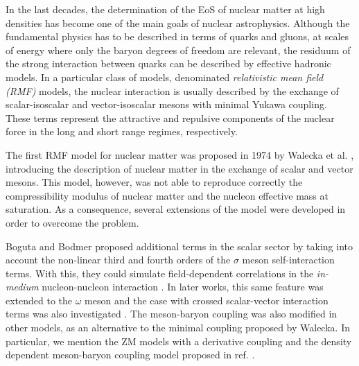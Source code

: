 \documentclass[twocolumn,showpacs,aps]{revtex4}
\begin{document}
In the last decades, the determination of the EoS of nuclear matter at high densities has become one 
of the main goals of nuclear astrophysics.
Although the fundamental physics has to be described in terms of quarks and gluons, 
at scales of energy where only the baryon degrees of freedom are relevant, the residuum of 
the strong interaction between quarks can be described by effective hadronic models. 
In a particular class of models, denominated 
\emph{relativistic mean field (RMF)} models, the nuclear interaction is usually described by the exchange of scalar-isoscalar and 
vector-isoscalar mesons with minimal Yukawa coupling. 
These terms represent the attractive and repulsive components of the nuclear force 
in the long and short range regimes, respectively.

The first RMF model for nuclear matter was proposed in 1974 by Walecka et al. \cite{Walecka1986}, 
introducing the description of nuclear matter in the exchange  of scalar and vector mesons. 
This model, however, was not able to reproduce correctly the 
compressibility modulus of nuclear matter and the nucleon effective mass at saturation.
As a consequence, several extensions of the model were developed in order to overcome the problem.

Boguta and Bodmer proposed additional terms in the scalar sector by taking into account the 
non-linear third and fourth orders of the $\sigma$ meson self-interaction terms.
With this, they could simulate field-dependent correlations
in the {\it in-medium} nucleon-nucleon interaction \cite{Boguta:1977xi}.
In later works, this same feature was extended to the $\omega$ meson \cite{Sugahara:1993wz, Toki1995} 
and the case with crossed scalar-vector interaction terms was also investigated \cite{ToddRutel:2005zz,Kumar:2006ij}.
The meson-baryon coupling was also modified in other models, as an alternative to the minimal coupling 
proposed by Walecka. In particular, we mention the ZM models with a derivative coupling \cite{Zimanyi:1990np}
and the density dependent meson-baryon coupling model proposed in ref. \cite{Typel:1999yq}. 
\end{document}
